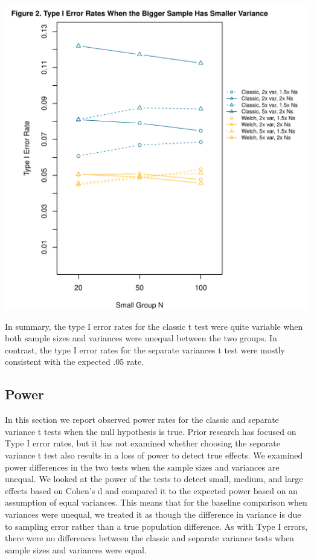 \documentclass[man]{apa6}\usepackage[]{graphicx}\usepackage[]{color}
\makeatletter
\def\maxwidth{ %
  \ifdim\Gin@nat@width>\linewidth
    \linewidth
  \else
    \Gin@nat@width
  \fi
}
\newenvironment{knitrout}{}{} %
\makeatother
\begin{document}
\begin{knitrout}
\color{fgcolor}
\includegraphics[width=\maxwidth]{figure/bsv_type1} 

\end{knitrout}
In summary, the type I error rates for the classic t test were quite variable when both sample sizes and variances were unequal between the two groups. In contrast, the type I error rates for the separate variances t test were mostly consistent with the expected .05 rate.

\subsection{Power}
In this section we report observed power rates for the classic and separate variance t tests when the null hypothesis is true. Prior research has focused on Type I error rates, but it has not examined whether choosing the separate variance t test also results in a loss of power to detect true effects. We examined power differences in the two tests when the sample sizes and variances are unequal. We looked at the power of the tests to detect small, medium, and large effects based on Cohen's d and compared it to the expected power based on an assumption of equal variances. This means that for the baseline comparison when variances were unequal, we treated it as though the difference in variance is due to sampling error rather than a true population difference. As with Type I errors, there were no differences between the classic and separate variance tests when sample sizes and variances were equal.
\end{document}
